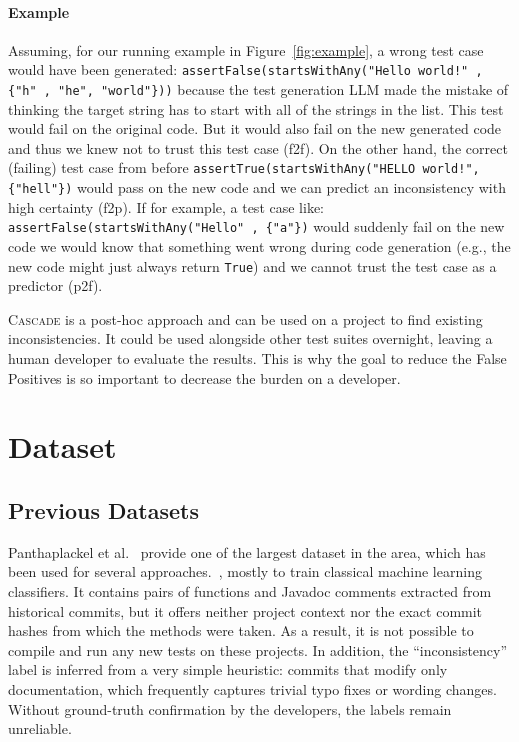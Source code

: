 \documentclass[acmsmall, screen]{acmart}
\newcommand{\tool}{\textsc{Cascade}\xspace}
\begin{document}
\paragraph*{Example} Assuming, for our running example in Figure~\ref{fig:example}, a wrong test case would have been generated: \texttt{assertFalse(startsWithAny("Hello world!" , \{"h" , "he", "world"\}))} because the test generation LLM made the mistake of thinking the target string has to start with all of the strings in the list. This test would fail on the original code. But it would also fail on the new generated code and thus we knew not to trust this test case (f2f).
On the other hand, the correct (failing) test case from before \texttt{assertTrue(startsWithAny("HELLO world!", \{"hell"\})} would pass on the new code and we can predict an inconsistency with high certainty (f2p). 
If for example, a test case like: \texttt{assertFalse(startsWithAny("Hello" , \{"a"\})} would suddenly fail on the new code we would know that something went wrong during code generation (e.g., the new code might just always return \texttt{True}) and we cannot trust the test case as a predictor (p2f). 

\tool is a post-hoc approach and can be used on a project to find existing inconsistencies. It could be used alongside other test suites overnight, leaving a human developer to evaluate the results. This is why the goal to reduce the False Positives is so important to decrease the burden on a developer.

\section{Dataset}\label{sec:dataset}
\subsection{Previous Datasets}
Panthaplackel et al.~\cite{panthaplackel2020learning} provide one of the largest dataset in the area, which has been used for several approaches.~\cite{panthaplackel2021deep, docchecker, carlama}, mostly to train classical machine learning classifiers. It contains pairs of functions and Javadoc comments extracted from historical commits, but it offers neither project context nor the exact commit hashes from which the methods were taken. As a result, it is not possible to compile and run any new tests on these projects.  In addition, the ``inconsistency'' label is inferred from a very simple heuristic: commits that modify only documentation, which frequently captures trivial typo fixes or wording changes. Without ground-truth confirmation by the developers, the labels
remain unreliable.
\end{document}
